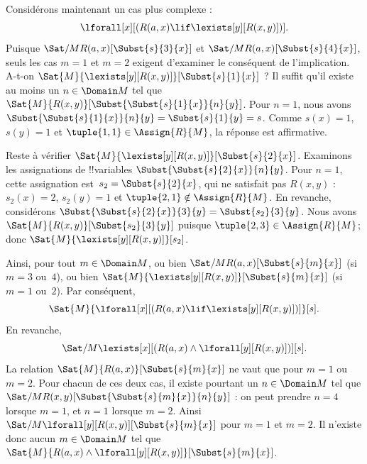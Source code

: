 \documentclass[../../../include/open-logic-section]{subfiles}
\begin{document}
\begin{ex}

Considérons maintenant un cas plus complexe :
\[
\lforall[x][(R(a,x) \lif \lexists[y][R(x,y)])].
\]
Puisque $\Sat/{M}{R(a,x)}[\Subst{s}{3}{x}]$ et
$\Sat/{M}{R(a,x)}[\Subst{s}{4}{x}]$, seuls les cas $m = 1$ et
$m = 2$ exigent d'examiner le conséquent de l'implication.
A-t-on $\Sat{M}{\lexists[y][R(x,y)]}[\Subst{s}{1}{x}]$ ? Il suffit
qu'il existe au moins un $n \in \Domain M$ tel que
$\Sat{M}{R(x,y)}[\Subst{\Subst{s}{1}{x}}{n}{y}]$. Pour $n = 1$,
nous avons $\Subst{\Subst{s}{1}{x}}{n}{y} = \Subst{s}{1}{y} = s$.
Comme $s(x) = 1$, $s(y) = 1$ et $\tuple{1,1} \in \Assign{R}{M}$,
la réponse est affirmative.

Reste à vérifier
$\Sat{M}{\lexists[y][R(x,y)]}[\Subst{s}{2}{x}]$.
Examinons les assignations de !!{variable}s
$\Subst{\Subst{s}{2}{x}}{n}{y}$. Pour $n = 1$, cette assignation
est~$s_2 = \Subst{s}{2}{x}$, qui ne satisfait pas $R(x,y)$ :
$s_2(x) = 2$, $s_2(y) = 1$ et
$\tuple{2,1}\notin \Assign{R}{M}$. En revanche, considérons
$\Subst{\Subst{s}{2}{x}}{3}{y} = \Subst{s_2}{3}{y}$.
Nous avons $\Sat{M}{R(x,y)}[\Subst{s_2}{3}{y}]$ puisque
$\tuple{2,3} \in \Assign{R}{M}$; donc
$\Sat{M}{\lexists[y][R(x,y)]}[s_2]$.

Ainsi, pour tout $m \in \Domain M$, ou bien
$\Sat/{M}{R(a,x)}[\Subst{s}{m}{x}]$ (si $m = 3$ ou~$4$), ou bien
$\Sat{M}{\lexists[y][R(x,y)]}[\Subst{s}{m}{x}]$ (si $m = 1$ ou~$2$).
Par conséquent,
\[
\Sat{M}{\lforall[x][(R(a,x) \lif \lexists[y][R(x,y)])]}[s].
\]
En revanche,
\[
\Sat/{M}{\lexists[x][(R(a,x) \land \lforall[y][R(x,y)])]}[s].
\]
La relation $\Sat{M}{R(a,x)}[\Subst{s}{m}{x}]$ ne vaut que pour
$m = 1$ ou $m = 2$. Pour chacun de ces deux cas, il existe pourtant
un $n \in \Domain M$ tel que
$\Sat/{M}{R(x,y)}[\Subst{\Subst{s}{m}{x}}{n}{y}]$ : on peut prendre
$n = 4$ lorsque $m = 1$, et $n = 1$ lorsque $m = 2$.
Ainsi $\Sat/{M}{\lforall[y][R(x,y)]}[\Subst{s}{m}{x}]$ pour
$m = 1$ et $m = 2$. Il n'existe donc aucun $m \in \Domain M$ tel que
$\Sat{M}{R(a,x) \land \lforall[y][R(x,y)]}[\Subst{s}{m}{x}]$.
\end{ex}
\end{document}
